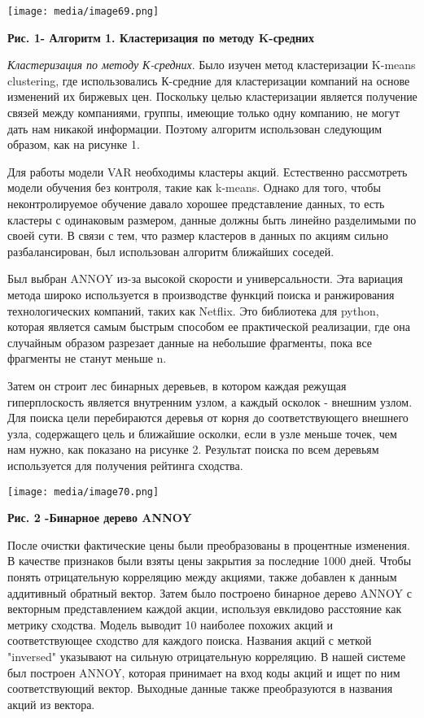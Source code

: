 \documentclass[
]{article}
\begin{document}
\texttt{[image: media/image69.png]}

\textbf{Рис. 1- Алгоритм 1. Кластеризация по методу K-средних}

\emph{Кластеризация по методу К-средних}. Было изучен метод
кластеризации K-means clustering, где использовались К-средние для
кластеризации компаний на основе изменений их биржевых цен. Поскольку
целью кластеризации является получение связей между компаниями, группы,
имеющие только одну компанию, не могут дать нам никакой информации.
Поэтому алгоритм использован следующим образом, как на рисунке 1.

Для работы модели VAR необходимы кластеры акций. Естественно рассмотреть
модели обучения без контроля, такие как k-means. Однако для того, чтобы
неконтролируемое обучение давало хорошее представление данных, то есть
кластеры с одинаковым размером, данные должны быть линейно разделимыми
по своей сути. В связи с тем, что размер кластеров в данных по акциям
сильно разбалансирован, был использован алгоритм ближайших соседей.

Был выбран ANNOY из-за высокой скорости и универсальности. Эта вариация
метода широко используется в производстве функций поиска и ранжирования
технологических компаний, таких как Netflix. Это библиотека для python,
которая является самым быстрым способом ее практической реализации, где
она случайным образом разрезает данные на небольшие фрагменты, пока все
фрагменты не станут меньше n.

Затем он строит лес бинарных деревьев, в котором каждая режущая
гиперплоскость является внутренним узлом, а каждый осколок - внешним
узлом. Для поиска цели перебираются деревья от корня до соответствующего
внешнего узла, содержащего цель и ближайшие осколки, если в узле меньше
точек, чем нам нужно, как показано на рисунке 2. Результат поиска по
всем деревьям используется для получения рейтинга сходства.

\texttt{[image: media/image70.png]}

\textbf{Рис. 2 -Бинарное дерево ANNOY}

После очистки фактические цены были преобразованы в процентные
изменения. В качестве признаков были взяты цены закрытия за последние
1000 дней. Чтобы понять отрицательную корреляцию между акциями, также
добавлен к данным аддитивный обратный вектор. Затем было построено
бинарное дерево ANNOY с векторным представлением каждой акции, используя
евклидово расстояние как метрику сходства. Модель выводит 10 наиболее
похожих акций и соответствующее сходство для каждого поиска. Названия
акций с меткой "inversed" указывают на сильную отрицательную корреляцию.
В нашей системе был построен ANNOY, которая принимает на вход коды акций
и ищет по ним соответствующий вектор. Выходные данные также
преобразуются в названия акций из вектора.
\end{document}

